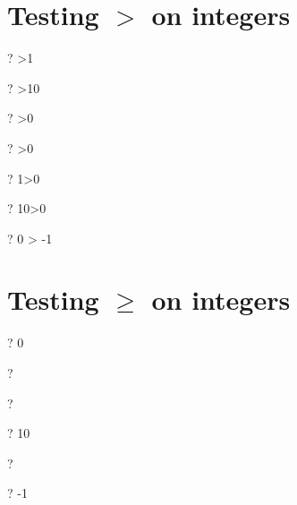 \documentclass{article}
\newcommand{\negate}{-}
\begin{document}
\section{Testing $>$ on integers}
\begin{zed} \vdash?   >1 \end{zed}
\begin{zed} \vdash?   >10 \end{zed}
\begin{zed} \vdash?   \lnot \negate 1>0 \end{zed}
\begin{zed} \vdash?   >0 \end{zed}
\begin{zed} \vdash?   1>0 \end{zed}
\begin{zed} \vdash?   10>0 \end{zed}
\begin{zed} \vdash?   0 > \negate 1 \end{zed}

\section{Testing $\geq$ on integers}
\begin{zed} \vdash?         0  \end{zed}
\begin{zed} \vdash?     \end{zed}
\begin{zed} \vdash?     \end{zed}
\begin{zed} \vdash?         10  \end{zed}
\begin{zed} \vdash?   \lnot \negate 1  \end{zed}
\begin{zed} \vdash?         \negate 1 \geq \negate 3 \end{zed}
\end{document}
